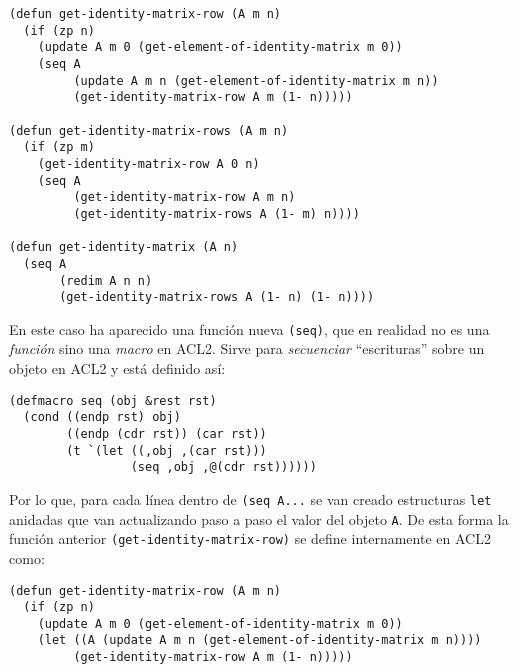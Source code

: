 \documentclass[a4paper,10pt]{article}
\begin{document}
\begin{lstlisting}[language=clips]
(defun get-identity-matrix-row (A m n)
  (if (zp n)
    (update A m 0 (get-element-of-identity-matrix m 0))
    (seq A
         (update A m n (get-element-of-identity-matrix m n))
         (get-identity-matrix-row A m (1- n)))))

(defun get-identity-matrix-rows (A m n)
  (if (zp m)
    (get-identity-matrix-row A 0 n)
    (seq A
         (get-identity-matrix-row A m n)
         (get-identity-matrix-rows A (1- m) n))))

(defun get-identity-matrix (A n)
  (seq A
       (redim A n n)
       (get-identity-matrix-rows A (1- n) (1- n))))
\end{lstlisting}

\par \vspace{10pt}		

En este caso ha aparecido una función nueva \texttt{(seq)}, que en realidad no es una \emph{función} sino una \emph{macro} en ACL2. Sirve para \emph{secuenciar} ``escrituras'' sobre un objeto en ACL2 y está definido así:

\par \vspace{10pt}		

\begin{lstlisting}[language=clips]
(defmacro seq (obj &rest rst)
  (cond ((endp rst) obj)
        ((endp (cdr rst)) (car rst))
        (t `(let ((,obj ,(car rst)))
                 (seq ,obj ,@(cdr rst))))))
\end{lstlisting}

\par \vspace{10pt}		

Por lo que, para cada línea dentro de \texttt{(seq A...} se van creado estructuras \texttt{let} anidadas que van actualizando paso a paso el valor del objeto \texttt{A}. De esta forma la función anterior \texttt{(get-identity-matrix-row)} se define internamente en ACL2 como:

\par \vspace{10pt}		

\begin{lstlisting}[language=clips]
(defun get-identity-matrix-row (A m n)
  (if (zp n)
    (update A m 0 (get-element-of-identity-matrix m 0))
    (let ((A (update A m n (get-element-of-identity-matrix m n))))
         (get-identity-matrix-row A m (1- n)))))
\end{lstlisting}
\end{document}
